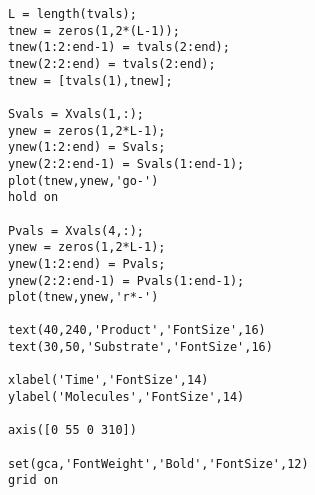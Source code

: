 \documentclass[a4paper, 10pt]{article}
\begin{document}
\begin{verbatim}
L = length(tvals);
tnew = zeros(1,2*(L-1));
tnew(1:2:end-1) = tvals(2:end);
tnew(2:2:end) = tvals(2:end);
tnew = [tvals(1),tnew];

Svals = Xvals(1,:);
ynew = zeros(1,2*L-1);
ynew(1:2:end) = Svals;
ynew(2:2:end-1) = Svals(1:end-1);
plot(tnew,ynew,'go-')
hold on

Pvals = Xvals(4,:);
ynew = zeros(1,2*L-1);
ynew(1:2:end) = Pvals;
ynew(2:2:end-1) = Pvals(1:end-1);
plot(tnew,ynew,'r*-')

text(40,240,'Product','FontSize',16)
text(30,50,'Substrate','FontSize',16)

xlabel('Time','FontSize',14)
ylabel('Molecules','FontSize',14)

axis([0 55 0 310])

set(gca,'FontWeight','Bold','FontSize',12)
grid on
\end{verbatim}
\end{document}
